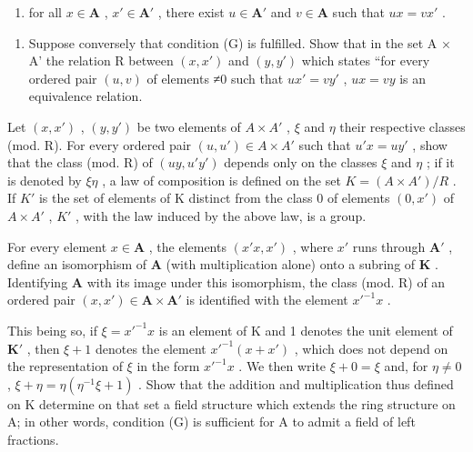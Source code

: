 \begin{enumerate}
\def\labelenumi{(\Alph{enumi})}
\setcounter{enumi}{6}
\tightlist
\item
  for all \(x \in \mathbf{A}\) , \(x' \in \mathbf{A}'\) , there exist \(u \in \mathbf{A}'\) and \(v \in \mathbf{A}\) such that \(ux = vx'\) .
\end{enumerate}

\begin{enumerate}
\def\labelenumi{(\alph{enumi})}
\setcounter{enumi}{1}
\tightlist
\item
  Suppose conversely that condition (G) is fulfilled. Show that in the set A × A' the relation R between \((x, x')\) and \((y, y')\) which states ``for every ordered pair \((u, v)\) of elements ≠0 such that \(ux' = vy'\) , \(ux = vy\) is an equivalence relation.
\end{enumerate}

Let \((x, x')\) , \((y, y')\) be two elements of \(A \times A'\) , \(\xi\) and \(\eta\) their respective classes (mod. R). For every ordered pair \((u, u') \in A \times A'\) such that \(u'x = uy'\) , show that the class (mod. R) of \((uy, u'y')\) depends only on the classes \(\xi\) and \(\eta\) ; if it is denoted by \(\xi\eta\) , a law of composition is defined on the set \(K = (A \times A')/R\) . If \(K'\) is the set of elements of K distinct from the class 0 of elements \((0, x')\) of \(A \times A'\) , \(K'\) , with the law induced by the above law, is a group.

For every element \(x \in \mathbf{A}\) , the elements \((x'x, x')\) , where \(x'\) runs through \(\mathbf{A}'\) , define an isomorphism of \(\mathbf{A}\) (with multiplication alone) onto a subring of \(\mathbf{K}\) . Identifying \(\mathbf{A}\) with its image under this isomorphism, the class (mod. R) of an ordered pair \((x, x') \in \mathbf{A} \times \mathbf{A}'\) is identified with the element \(x'^{-1}x\) .

This being so, if \(\xi = x'^{-1}x\) is an element of K and 1 denotes the unit element of \(\mathbf{K}'\) , then \(\xi + 1\) denotes the element \(x'^{-1}(x + x')\) , which does not depend on the representation of \(\xi\) in the form \(x'^{-1}x\) . We then write \(\xi + 0 = \xi\) and, for \(\eta \neq 0\) , \(\xi + \eta = \eta(\eta^{-1}\xi + 1)\) . Show that the addition and multiplication thus defined on K determine on that set a field structure which extends the ring structure on A; in other words, condition (G) is sufficient for A to admit a field of left fractions.

